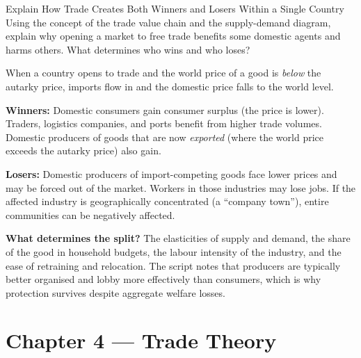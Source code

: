 \documentclass[paper=a5]{scrartcl}
\begin{document}
\begin{question}[type=open]{Explain How Trade Creates Both Winners and Losers Within
  a Single Country}
Using the concept of the trade value chain and the supply-demand diagram,
explain why opening a market to free trade benefits some domestic agents
and harms others. What determines who wins and who loses?

\answerlines[7]

\begin{solution}
  When a country opens to trade and the world price of a good is \emph{below}
  the autarky price, imports flow in and the domestic price falls to the world
  level.

  \textbf{Winners:} Domestic consumers gain consumer surplus (the price is
  lower). Traders, logistics companies, and ports benefit from higher trade
  volumes. Domestic producers of goods that are now \emph{exported} (where
  the world price exceeds the autarky price) also gain.

  \textbf{Losers:} Domestic producers of import-competing goods face lower
  prices and may be forced out of the market. Workers in those industries may
  lose jobs. If the affected industry is geographically concentrated (a
  ``company town''), entire communities can be negatively affected.

  \textbf{What determines the split?} The elasticities of supply and demand,
  the share of the good in household budgets, the labour intensity of the
  industry, and the ease of retraining and relocation. The script notes that
  producers are typically better organised and lobby more effectively than
  consumers, which is why protection survives despite aggregate welfare losses.
\end{solution}
\end{question}


\section{Chapter 4 — Trade Theory}
\end{document}

